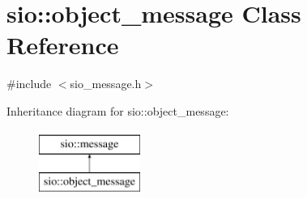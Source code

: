 \hypertarget{classsio_1_1object__message}{}\section{sio\+:\+:object\+\_\+message Class Reference}
\label{classsio_1_1object__message}


{\ttfamily \#include $<$sio\+\_\+message.\+h$>$}

Inheritance diagram for sio\+:\+:object\+\_\+message\+:\begin{figure}[H]
\begin{center}
\leavevmode
\includegraphics[height=2.000000cm]{classsio_1_1object__message}
\end{center}
\end{figure}
